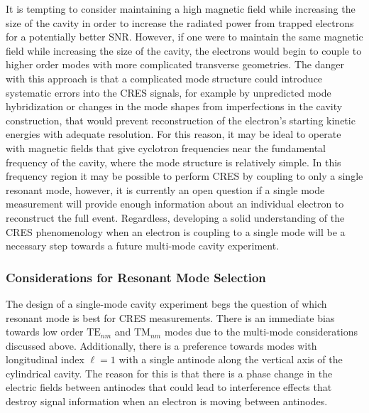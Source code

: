 It is tempting to consider maintaining a high magnetic field while increasing the size of the cavity in order to increase the radiated power from trapped electrons for a potentially better SNR. However, if one were to maintain the same magnetic field while increasing the size of the cavity, the electrons would begin to couple to higher order modes with more complicated transverse geometries. The danger with this approach is that a complicated mode structure could introduce systematic errors into the CRES signals, for example by unpredicted mode hybridization or changes in the mode shapes from imperfections in the cavity construction, that would prevent reconstruction of the electron's starting kinetic energies with adequate resolution. For this reason, it may be ideal to operate with magnetic fields that give cyclotron frequencies near the fundamental frequency of the cavity, where the mode structure is relatively simple. In this frequency region it may be possible to perform CRES by coupling to only a single resonant mode, however, it is currently an open question if a single mode measurement will provide enough information about an individual electron to reconstruct the full event. Regardless, developing a solid understanding of the CRES phenomenology when an electron is coupling to a single mode will be a necessary step towards a future multi-mode cavity experiment.

\subsubsection*{Considerations for Resonant Mode Selection}

The design of a single-mode cavity experiment begs the question of which resonant mode is best for CRES measurements. There is an immediate bias towards low order $\mathrm{TE}_{nm}$ and $\mathrm{TM}_{nm}$ modes due to the multi-mode considerations discussed above. Additionally, there is a preference towards modes with longitudinal index $\ell=1$ with a single antinode along the vertical axis of the cylindrical cavity. The reason for this is that there is a phase change in the electric fields between antinodes that could lead to interference effects that destroy signal information when an electron is moving between antinodes. 

